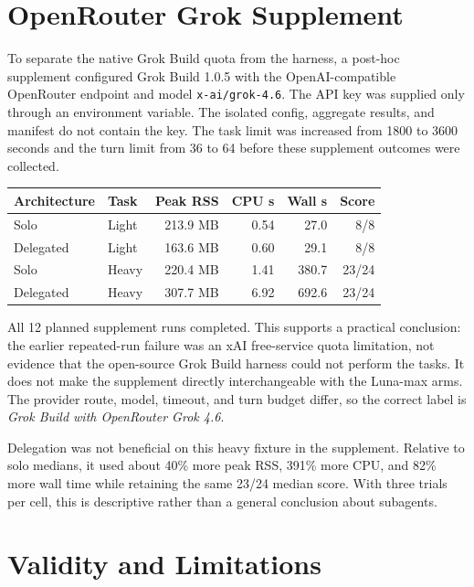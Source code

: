 \documentclass[11pt]{article}
\begin{document}
\section{OpenRouter Grok Supplement}

To separate the native Grok Build quota from the harness, a post-hoc supplement
configured Grok Build 1.0.5 with the OpenAI-compatible OpenRouter endpoint and
model \texttt{x-ai/grok-4.6}. The API key was supplied only through an
environment variable. The isolated config, aggregate results, and manifest do
not contain the key. The task limit was increased from 1800 to 3600 seconds and
the turn limit from 36 to 64 before these supplement outcomes were collected.

\begin{center}
\begin{tabular}{llrrrr}
\toprule
Architecture & Task & Peak RSS & CPU s & Wall s & Score \\
\midrule
Solo & Light & 213.9 MB & 0.54 & 27.0 & 8/8 \\
Delegated & Light & 163.6 MB & 0.60 & 29.1 & 8/8 \\
Solo & Heavy & 220.4 MB & 1.41 & 380.7 & 23/24 \\
Delegated & Heavy & 307.7 MB & 6.92 & 692.6 & 23/24 \\
\bottomrule
\end{tabular}
\end{center}

All 12 planned supplement runs completed. This supports a practical conclusion:
the earlier repeated-run failure was an xAI free-service quota limitation, not
evidence that the open-source Grok Build harness could not perform the tasks.
It does not make the supplement directly interchangeable with the Luna-max arms.
The provider route, model, timeout, and turn budget differ, so the correct label
is \emph{Grok Build with OpenRouter Grok 4.6}.

Delegation was not beneficial on this heavy fixture in the supplement. Relative
to solo medians, it used about 40\% more peak RSS, 391\% more CPU, and 82\% more
wall time while retaining the same 23/24 median score. With three trials per
cell, this is descriptive rather than a general conclusion about subagents.

\section{Validity and Limitations}
\end{document}
